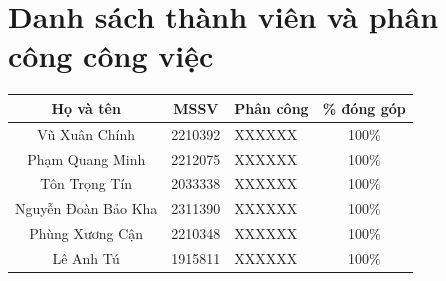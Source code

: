 \documentclass[12pt, a4paper, twoside]{report}
\begin{document}
\pagestyle{fancy}

\renewcommand{\contentsname}{\bfseries\Large MỤC LỤC}

\newpage
\tableofcontents
\thispagestyle{fancy}

\newpage
\listoffigures
\thispagestyle{fancy}

\newpage
\listoftables
\thispagestyle{fancy}

\newpage


\newpage
\section*{Danh sách thành viên và phân công công việc}
\thispagestyle{fancy}
\renewcommand{\arraystretch}{1.5}

\begin{center}
\begin{tabular}{|c|c|p{6cm}|c|}
\hline
\textbf{Họ và tên} & \textbf{MSSV} & \textbf{Phân công} & \textbf{\% đóng góp}\\
\hline

\multirow{3}{*}{Vũ Xuân Chính} 
& \multirow{3}{*}{2210392} 
& \multirow{3}{*}{\parbox{6cm}{XXXXXX}} 
& \multirow{3}{*}{100\%}\\
& & &\\
& & &\\
\hline

\multirow{3}{*}{Phạm Quang Minh} 
& \multirow{3}{*}{2212075} 
& \multirow{3}{*}{\parbox{6cm}{XXXXXX}} 
& \multirow{3}{*}{100\%}\\
& & &\\
& & &\\
\hline

\multirow{3}{*}{Tôn Trọng Tín} 
& \multirow{3}{*}{2033338} 
& \multirow{3}{*}{\parbox{6cm}{XXXXXX}} 
& \multirow{3}{*}{100\%}\\
& & &\\
& & &\\
\hline

\multirow{3}{*}{Nguyễn Đoàn Bảo Kha} 
& \multirow{3}{*}{2311390} 
& \multirow{3}{*}{\parbox{6cm}{XXXXXX}} 
& \multirow{3}{*}{100\%}\\
& & &\\
& & &\\
\hline

\multirow{3}{*}{Phùng Xương Cận} 
& \multirow{3}{*}{2210348} 
& \multirow{3}{*}{\parbox{6cm}{XXXXXX}} 
& \multirow{3}{*}{100\%}\\
& & &\\
& & &\\
\hline

\multirow{3}{*}{Lê Anh Tú} 
& \multirow{3}{*}{1915811} 
& \multirow{3}{*}{\parbox{6cm}{XXXXXX}} 
& \multirow{3}{*}{100\%}\\
& & &\\
& & &\\
\hline

\end{tabular}
\end{center}
\end{document}
